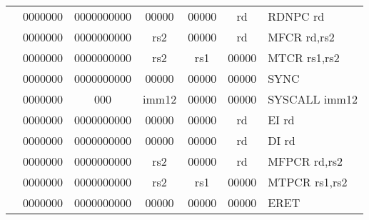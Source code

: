 \begin{table}[p]
\begin{small}
\begin{center}
\begin{tabular}{rcccccccccl}
&
\multicolumn{1}{|c|}{0000000} &
\multicolumn{5}{c|}{0000000000} &
\multicolumn{1}{c|}{00000} &
\multicolumn{1}{c|}{00000} &
\multicolumn{1}{c|}{rd} & RDNPC rd \\
\cline{2-10}
  

&
\multicolumn{1}{|c|}{0000000} &
\multicolumn{5}{c|}{0000000000} &
\multicolumn{1}{c|}{rs2} &
\multicolumn{1}{c|}{00000} &
\multicolumn{1}{c|}{rd} & MFCR rd,rs2 \\
\cline{2-10}
  

&
\multicolumn{1}{|c|}{0000000} &
\multicolumn{5}{c|}{0000000000} &
\multicolumn{1}{c|}{rs2} &
\multicolumn{1}{c|}{rs1} &
\multicolumn{1}{c|}{00000} & MTCR rs1,rs2 \\
\cline{2-10}
  

&
\multicolumn{1}{|c|}{0000000} &
\multicolumn{5}{c|}{0000000000} &
\multicolumn{1}{c|}{00000} &
\multicolumn{1}{c|}{00000} &
\multicolumn{1}{c|}{00000} & SYNC  \\
\cline{2-10}
  

&
\multicolumn{1}{|c|}{0000000} &
\multicolumn{2}{c|}{000} &
\multicolumn{4}{c|}{imm12} &
\multicolumn{1}{c|}{00000} &
\multicolumn{1}{c|}{00000} & SYSCALL imm12 \\
\cline{2-10}
  

&
\multicolumn{1}{|c|}{0000000} &
\multicolumn{5}{c|}{0000000000} &
\multicolumn{1}{c|}{00000} &
\multicolumn{1}{c|}{00000} &
\multicolumn{1}{c|}{rd} & EI rd \\
\cline{2-10}
  

&
\multicolumn{1}{|c|}{0000000} &
\multicolumn{5}{c|}{0000000000} &
\multicolumn{1}{c|}{00000} &
\multicolumn{1}{c|}{00000} &
\multicolumn{1}{c|}{rd} & DI rd \\
\cline{2-10}
  

&
\multicolumn{1}{|c|}{0000000} &
\multicolumn{5}{c|}{0000000000} &
\multicolumn{1}{c|}{rs2} &
\multicolumn{1}{c|}{00000} &
\multicolumn{1}{c|}{rd} & MFPCR rd,rs2 \\
\cline{2-10}
  

&
\multicolumn{1}{|c|}{0000000} &
\multicolumn{5}{c|}{0000000000} &
\multicolumn{1}{c|}{rs2} &
\multicolumn{1}{c|}{rs1} &
\multicolumn{1}{c|}{00000} & MTPCR rs1,rs2 \\
\cline{2-10}
  

&
\multicolumn{1}{|c|}{0000000} &
\multicolumn{5}{c|}{0000000000} &
\multicolumn{1}{c|}{00000} &
\multicolumn{1}{c|}{00000} &
\multicolumn{1}{c|}{00000} & ERET  \\
\cline{2-10}
  


\end{tabular}
\end{center}
\end{small}
\end{table}

